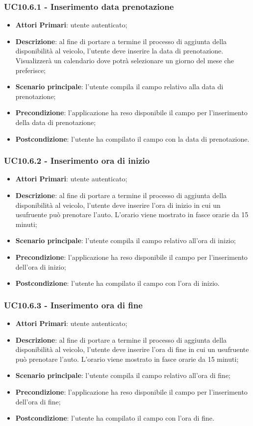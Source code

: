 \subsubsection{UC10.6.1 - Inserimento data prenotazione}
\begin{itemize}
	\item \textbf{Attori Primari}: utente autenticato;
	\item \textbf{Descrizione}: al fine di portare a termine il processo di aggiunta della disponibilità al veicolo, l'utente deve inserire la data di prenotazione. Visualizzerà un calendario dove potrà selezionare un giorno del mese che preferisce;
	\item \textbf{Scenario principale}: l'utente compila il campo relativo alla data di prenotazione;	
	\item \textbf{Precondizione}: l'applicazione ha reso disponibile il campo per l'inserimento della data di prenotazione;
	\item \textbf{Postcondizione}: l'utente ha compilato il campo con la data di prenotazione.	
\end{itemize}
\subsubsection{UC10.6.2 - Inserimento ora di inizio}
\begin{itemize}
	\item \textbf{Attori Primari}: utente autenticato;
	\item \textbf{Descrizione}: al fine di portare a termine il processo di aggiunta della disponibilità al veicolo, l'utente deve inserire l'ora di inizio in cui un usufruente può prenotare l'auto. L'orario viene mostrato in fasce orarie da 15 minuti;
	\item \textbf{Scenario principale}: l'utente compila il campo relativo all'ora di inizio;	
	\item \textbf{Precondizione}: l'applicazione ha reso disponibile il campo per l'inserimento dell'ora di inizio;
	\item \textbf{Postcondizione}: l'utente ha compilato il campo con l'ora di inizio.	
\end{itemize}
\subsubsection{UC10.6.3 - Inserimento ora di fine}
\begin{itemize}
	\item \textbf{Attori Primari}: utente autenticato;
	\item \textbf{Descrizione}: al fine di portare a termine il processo di aggiunta della disponibilità al veicolo, l'utente deve inserire l'ora di fine in cui un usufruente può prenotare l'auto. L'orario viene mostrato in fasce orarie da 15 minuti;
	\item \textbf{Scenario principale}: l'utente compila il campo relativo all'ora di fine;	
	\item \textbf{Precondizione}: l'applicazione ha reso disponibile il campo per l'inserimento dell'ora di fine;
	\item \textbf{Postcondizione}: l'utente ha compilato il campo con l'ora di fine.	
\end{itemize}
